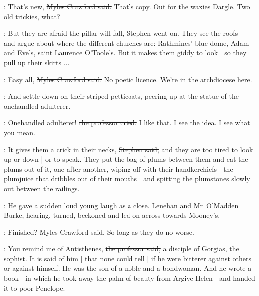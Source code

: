 
\crawford:
That's new,
\sout{Myles Crawford said.}
That's copy.
Out for the waxies Dargle.
Two old trickies, what?

\Stephen:
But they are afraid the pillar will fall,
\sout{Stephen went on.}
They see the roofs |
and argue about where the different churches are:
Rathmines' blue dome,
Adam and Eve's,
saint Laurence O'Toole's.
But it makes them giddy to look |
so they pull up their skirts ...



\crawford:
Easy all,
\sout{Myles Crawford said.}
No poetic licence.
We're in the archdiocese here.

\Stephen:
And settle down on their striped petticoats,
peering up at the statue of the onehandled adulterer.

\machugh:
Onehandled adulterer!
\sout{the professor cried.}
I like that.
I see the idea.
I see what you mean.%



\Stephen:
It gives them a crick in their necks,
\sout{Stephen said,}
and they are too tired to look up or down |
or to speak.
They put the bag of plums between them and eat the plums out of it,
one after another,
wiping off with their handkerchiefs |
the plumjuice that dribbles out of their mouths |
and spitting the plumstones slowly out between the railings.

:
He gave a sudden loud young laugh as a close.
Lenehan and Mr~O'Madden Burke,
hearing,
turned,
beckoned
and led on across towards Mooney's.%

\crawford:
Finished?
\sout{Myles Crawford said.}
So long as they do no worse.



\machugh:
You remind me of Antisthenes,
\sout{the professor said,}
a disciple of Gorgias, the sophist.
It is said of him |
that none could tell |
if he were bitterer against others or against himself.
He was the son of a noble and a bondwoman.
And he wrote a book |
in which he took away the palm of beauty from Argive Helen |
and handed it to poor Penelope.

